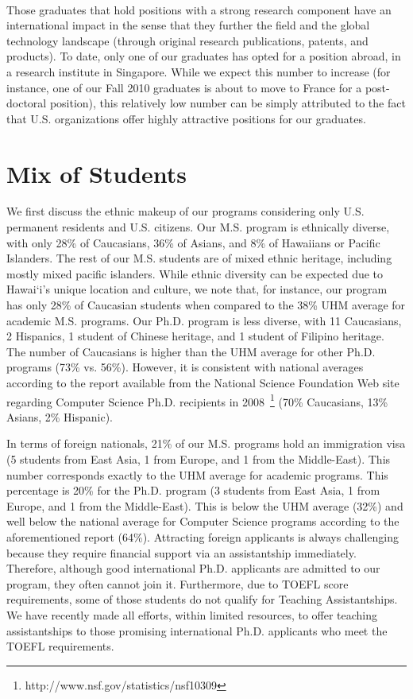 \documentclass[12pt]{article}
\begin{document}
~\\
 Those graduates
that hold positions with a strong research component have an
international impact in the sense that they further the field and the
global technology landscape (through original research publications,
patents, and products). To date, only one of our
graduates has opted for a position abroad, in a research institute in
Singapore. While we expect this number to increase (for instance, one
of our Fall 2010 graduates is about to move to France for a
post-doctoral position), this relatively low number can be simply
attributed to the fact that U.S. organizations offer highly attractive
positions for our graduates.



\section{Mix of Students}
\label{sec.mix}

We first discuss the ethnic makeup of our programs considering only
U.S. permanent residents and U.S. citizens. Our M.S. program is
ethnically diverse, with only 28\% of Caucasians, 36\% of Asians, and 8\%
of Hawaiians or Pacific Islanders. The rest of our M.S. students are
of mixed ethnic heritage, including mostly mixed pacific islanders.  While
ethnic diversity can be expected due to Hawai`i's unique location and
culture, we note that, for instance, our program has only 28\% of
Caucasian students when compared to the 38\% UHM average for academic
M.S. programs.  Our Ph.D. program is less diverse, with 11 Caucasians,
2 Hispanics, 1 student of Chinese heritage, and 1 student of Filipino
heritage. The number of Caucasians is higher than the UHM average for
other Ph.D. programs  (73\% vs. 56\%). However, it is consistent with
national averages according to the report available from the National
Science Foundation Web site regarding Computer Science Ph.D.
recipients in 2008~\footnote{http://www.nsf.gov/statistics/nsf10309}
(70\% Caucasians, 13\% Asians, 2\% Hispanic).

In terms of foreign nationals, 21\% of our M.S. programs hold an
immigration visa (5 students from East Asia, 1 from Europe, and 1 from
the Middle-East). This number corresponds exactly to the UHM average
for academic programs. This percentage is 20\% for the Ph.D.  program
(3 students from East Asia, 1 from Europe, and 1 from the
Middle-East). This is below the UHM average (32\%) and well below the
national average for Computer Science programs according to the aforementioned report (64\%). Attracting
foreign applicants is always challenging because they
require financial support via an assistantship immediately.
Therefore, although good international Ph.D. applicants are admitted
to our program, they often cannot join it. Furthermore, due
to TOEFL score requirements, some of those students do not qualify for
Teaching Assistantships. We have recently made all efforts, within
limited resources, to offer teaching assistantships to those promising
international Ph.D. applicants who meet the TOEFL requirements.
\end{document}
